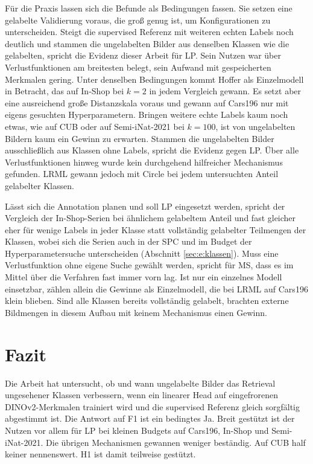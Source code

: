 Für die Praxis lassen sich die Befunde als Bedingungen fassen. Sie setzen eine gelabelte Validierung voraus, die groß genug ist, um Konfigurationen zu unterscheiden. Steigt die supervised Referenz mit weiteren echten Labels noch deutlich und stammen die ungelabelten Bilder aus denselben Klassen wie die gelabelten, spricht die Evidenz dieser Arbeit für \ac{LP}. Sein Nutzen war über Verlustfunktionen am breitesten belegt, sein Aufwand mit gespeicherten Merkmalen gering. Unter denselben Bedingungen kommt Hoffer als Einzelmodell in Betracht, das auf In-Shop bei $k=2$ in jedem Vergleich gewann. Es setzt aber eine ausreichend große Distanzskala voraus und gewann auf Cars196 nur mit eigens gesuchten Hyperparametern. Bringen weitere echte Labels kaum noch etwas, wie auf \ac{CUB} oder auf Semi-iNat-2021 bei $k=100$, ist von ungelabelten Bildern kaum ein Gewinn zu erwarten. Stammen die ungelabelten Bilder ausschließlich aus Klassen ohne Labels, spricht die Evidenz gegen \ac{LP}. Über alle Verlustfunktionen hinweg wurde kein durchgehend hilfreicher Mechanismus gefunden. \ac{LRML} gewann jedoch mit Circle bei jedem untersuchten Anteil gelabelter Klassen. 

Lässt sich die Annotation planen und soll \ac{LP} eingesetzt werden, spricht der Vergleich der In-Shop-Serien bei ähnlichem gelabeltem Anteil und fast gleicher \UEBL eher für wenige Labels in jeder Klasse statt vollständig gelabelter Teilmengen der Klassen, wobei sich die Serien auch in der \ac{SPC} und im Budget der Hyperparametersuche unterscheiden (Abschnitt \ref{sec:e:klassen}). Muss eine Verlustfunktion ohne eigene Suche gewählt werden, spricht für \ac{MS}, dass es im Mittel über die Verfahren fast immer vorn lag. Ist nur ein einzelnes Modell einsetzbar, zählen allein die Gewinne als Einzelmodell, die bei \ac{LRML} auf Cars196 klein blieben. Sind alle Klassen bereits vollständig gelabelt, brachten externe Bildmengen in diesem Aufbau mit keinem Mechanismus einen Gewinn.

\section{Fazit}
\label{sec:d:fazit}

Die Arbeit hat untersucht, ob und wann ungelabelte Bilder das Retrieval ungesehener Klassen verbessern, wenn ein linearer Head auf eingefrorenen DINOv2-Merkmalen trainiert wird und die supervised Referenz gleich sorgfältig abgestimmt ist. Die Antwort auf F1 ist ein bedingtes Ja. Breit gestützt ist der Nutzen vor allem für \ac{LP} bei kleinen Budgets auf Cars196, In-Shop und Semi-iNat-2021. Die übrigen Mechanismen gewannen weniger beständig. Auf \ac{CUB} half keiner nennenswert. H1 ist damit teilweise gestützt.

